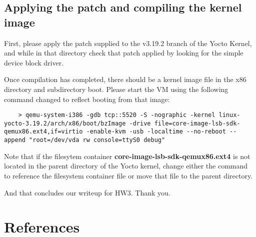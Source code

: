 \documentclass[onecolumn, draftclsnofoot,10pt, compsoc]{IEEEtran}
\begin{document}
\begin{enumerate}
    \subsection*{Applying the patch and compiling the kernel image}
    \begin{singlespace}
    First, please apply the patch supplied to the v3.19.2 branch of the Yocto Kernel, and while in that directory check that patch applied by looking for the simple device block driver.

    Once compilation has completed, there should be a kernel image file in the x86 directory and subdirectory boot. Please start the VM using the following command changed to reflect booting from that image:
    \end{singlespace}
    \begin{lstlisting}
    > qemu-system-i386 -gdb tcp::5520 -S -nographic -kernel linux-yocto-3.19.2/arch/x86/boot/bzImage -drive file=core-image-lsb-sdk-qemux86.ext4,if=virtio -enable-kvm -usb -localtime --no-reboot --append "root=/dev/vda rw console=ttyS0 debug"

    \end{lstlisting}
    \begin{singlespace}
    Note that if the filesytem container {\bf core-image-lsb-sdk-qemux86.ext4} is not located in the parent directory of the Yocto kernel, change either the command to reference the filesystem container file or move that file to the parent directory. 
    \end{singlespace}
    
    And that concludes our writeup for HW3. Thank you. 
  
\end{enumerate}


\section{References}
  

\end{document}
